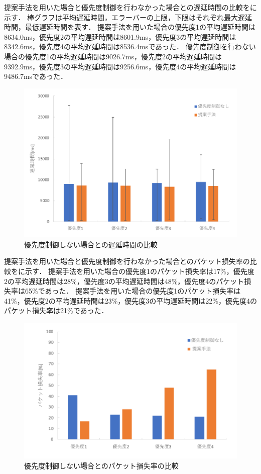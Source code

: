 \documentclass[a4paper,11pt,uplatex]{ujreport}
\begin{document}
  提案手法を用いた場合と優先度制御を行わなかった場合との遅延時間の比較をに示す．
  棒グラフは平均遅延時間，エラーバーの上限，下限はそれぞれ最大遅延時間，最低遅延時間を表す．
  提案手法を用いた場合の優先度1の平均遅延時間は8634.0ms，優先度2の平均遅延時間は8601.9ms，優先度3の平均遅延時間は8342.6ms，優先度4の平均遅延時間は8536.4msであった．
  優先度制御を行わない場合の優先度1の平均遅延時間は9026.7ms，優先度2の平均遅延時間は9392.9ms，優先度3の平均遅延時間は9256.6ms，優先度4の平均遅延時間は9486.7msであった．

  \begin{figure}[tb]
    \centering
    \includegraphics[width=0.85\linewidth]{img/RTT_1.pdf}
    \caption{優先度制御しない場合との遅延時間の比較}
    \label{fig:RTT_1}
  \end{figure}

  提案手法を用いた場合と優先度制御を行わなかった場合とのパケット損失率の比較をに示す．
  提案手法を用いた場合の優先度1のパケット損失率は17\%，優先度2の平均遅延時間は28\%，優先度3の平均遅延時間は48\%，優先度4のパケット損失率は65\%であった．
  提案手法を用いた場合の優先度1のパケット損失率は41\%，優先度2の平均遅延時間は23\%，優先度3の平均遅延時間は22\%，優先度4のパケット損失率は21\%であった．

  \begin{figure}[tb]
    \centering
    \includegraphics[width=0.85\linewidth]{img/packetloss_1.pdf}
    \caption{優先度制御しない場合とのパケット損失率の比較}
    \label{fig:packetloss_1}
  \end{figure}
\end{document}
